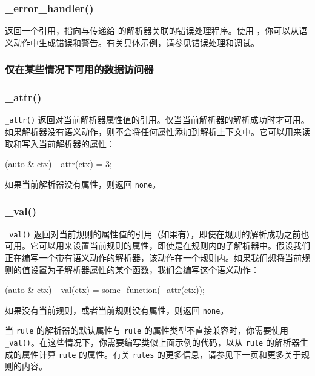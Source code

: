 \subsubsection{\_error\_handler()}

 返回一个引用，指向与传递给  的解析器关联的错误处理程序。使用 ，你可以从语义动作中生成错误和警告。有关具体示例，请参见错误处理和调试。

\subsubsection{仅在某些情况下可用的数据访问器}

\subsubsection{\_attr()}

\texttt{\_attr()} 返回对当前解析器属性值的引用。仅当当前解析器的解析成功时才可用。如果解析器没有语义动作，则不会将任何属性添加到解析上下文中。它可以用来读取和写入当前解析器的属性：

\begin{code}
[](auto & ctx) { _attr(ctx) = 3; }
\end{code}

如果当前解析器没有属性，则返回 \texttt{none}。

\subsubsection{\_val()}

\texttt{\_val()} 返回对当前规则的属性值的引用（如果有），即使在规则的解析成功之前也可用。它可以用来设置当前规则的属性，即使是在规则内的子解析器中。假设我们正在编写一个带有语义动作的解析器，该动作在一个规则内。如果我们想将当前规则的值设置为子解析器属性的某个函数，我们会编写这个语义动作：

\begin{code}
[](auto & ctx) { _val(ctx) = some_function(_attr(ctx)); }
\end{code}

如果没有当前规则，或者当前规则没有属性，则返回 \texttt{none}。

当 \texttt{rule} 的解析器的默认属性与 \texttt{rule} 的属性类型不直接兼容时，你需要使用 \texttt{\_val()}。在这些情况下，你需要编写类似上面示例的代码，以从 \texttt{rule} 的解析器生成的属性计算 \texttt{rule} 的属性。有关 \texttt{rules} 的更多信息，请参见下一页和更多关于规则的内容。

